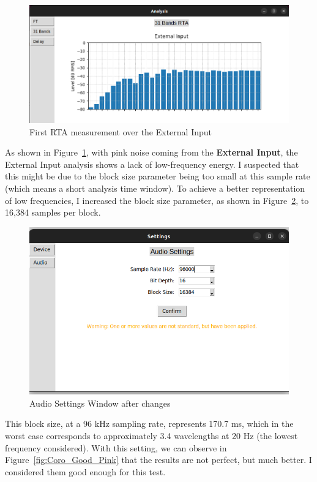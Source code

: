 \begin{figure}[H]
	\centering
	\includegraphics[width=0.8
	\linewidth]{Figures/Coro_Pink_Bad.png}
	\caption{First RTA measurement over the External Input}
	\label{fig:Coro_Bad_Pink}
\end{figure}

As shown in Figure~\ref{fig:Coro_Bad_Pink}, with pink noise coming from the \textbf{External Input}, the External Input analysis shows a lack of low-frequency energy. I suspected that this might be due to the block size parameter being too small at this sample rate (which means a short analysis time window). To achieve a better representation of low frequencies, I increased the block size parameter, as shown in Figure~\ref{fig:Coro_audio_settings}, to 16,384 samples per block.

\begin{figure}[H]
	\centering
	\includegraphics[width=0.6
	\linewidth]{Figures/Coro_audio_settings.png}
	\caption{Audio Settings Window after changes}
	\label{fig:Coro_audio_settings}
\end{figure}

This block size, at a 96 kHz sampling rate, represents 170.7 ms, which in the worst case corresponds to approximately 3.4 wavelengths at 20 Hz (the lowest frequency considered). With this  setting, we can observe in Figure~\ref{fig:Coro_Good_Pink} that the results are not perfect, but much better. I considered them good enough for this test.

